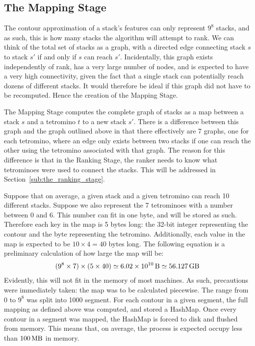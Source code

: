 \documentclass[fontsize=12pt]{article}
\begin{document}
\subsection{The Mapping Stage}
\label{sub:the_mapping_stage}

\par The contour approximation of a stack's features can only represent $9^8$ stacks, and as such, this is how many stacks the algorithm will attempt to rank. We can think of the total set of stacks as a graph, with a directed edge connecting stack $s$ to stack $s'$ if and only if $s$ can reach $s'$. Incidentally, this graph exists independently of rank, has a very large number of nodes, and is expected to have a very high connectivity, given the fact that a single stack can potentially reach dozens of different stacks. It would therefore be ideal if this graph did not have to be recomputed. Hence the creation of the Mapping Stage.
\par The Mapping Stage computes the complete graph of stacks as a map between a stack $s$ and a tetromino $t$ to a new stack $s'$. There is a difference between this graph and the graph outlined above in that there effectively are 7 graphs, one for each tetromino, where an edge only exists between two stacks if one can reach the other using the tetromino associated with that graph. The reason for this difference is that in the Ranking Stage, the ranker needs to know what tetrominoes were used to connect the stacks. This will be addressed in Section~\ref{sub:the_ranking_stage}.
\par Suppose that on average, a given stack and a given tetromino can reach 10 different stacks. Suppose we also represent the 7 tetrominoes with a number between 0 and 6. This number can fit in one byte, and will be stored as such. Therefore each key in the map is 5 bytes long: the 32-bit integer representing the contour and the byte representing the tetromino. Additionally, each value in the map is expected to be $10 \times 4 = 40$ bytes long. The following equation is a preliminary calculation of how large the map will be:
\begin{align*}
  (9^8 \times 7) \times (5 \times 40) \simeq \SI{6.02e10}{\byte} \simeq \SI{56.127}{\giga\byte}\label{eq:map_size}
\end{align*}
Evidently, this will not fit in the memory of most machines. As such, precautions were immediately taken: the map was to be calculated piecewise. The range from 0 to $9^8$ was split into 1000 segment. For each contour in a given segment, the full mapping as defined above was computed, and stored a HashMap. Once every contour in a segment was mapped, the HashMap is forced to disk and flushed from memory. This means that, on average, the process is expected occupy less than $\SI{100}{\mega\byte}$ in memory.
\end{document}
